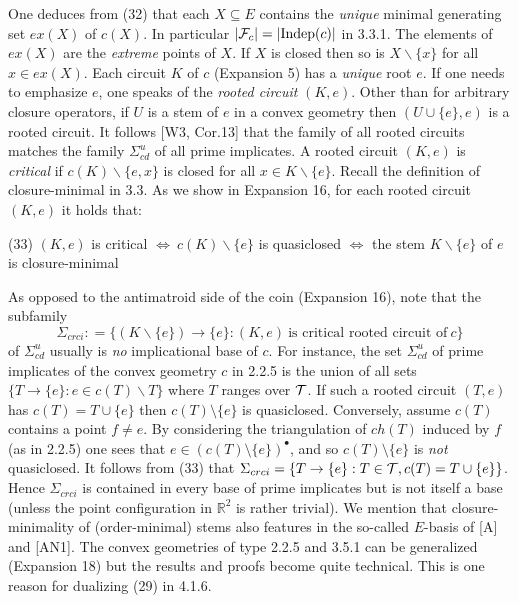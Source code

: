 \documentclass[11pt]{article}
\newcommand{\R}{\mathbb{R}}
\newcommand{\ra}{\rightarrow}
\begin{document}
One deduces from (32) that each $X \subseteq E$ contains the {\it unique} minimal generating set $ex(X)$ of $c(X)$. In particular $|{\cal F}_c| = |\mbox{Indep}(c)|$ in 3.3.1.  The elements of $ex(X)$ are the {\it extreme} points of $X$. If $X$ is closed then so is $X \backslash \{x\}$ for all $x \in ex (X)$.
Each circuit $K$ of $c$ (Expansion 5) has a {\it unique} root $e$. If one needs to emphasize $e$, one speaks of the {\it rooted circuit} $(K, e)$. Other than for arbitrary closure operators, if $U$ is a stem of $e$ in a convex geometry then $(U \cup \{e\}, e)$ is a rooted circuit. It follows [W3, Cor.13] that the family of all rooted circuits matches the family $\Sigma_{cd}^u$ of all prime implicates. A rooted circuit $(K, e)$ is {\it critical} if $c(K) \backslash \{e, x\}$ is closed for all $x \in K \backslash \{e\}$. Recall the definition of closure-minimal in 3.3. As we show in Expansion 16, for each rooted circuit $(K, e)$ it holds that:

(33) \quad $(K, e)$ is critical $\Leftrightarrow \ c(K)\backslash \{e\}$ is quasiclosed $\Leftrightarrow$ the stem $K \backslash \{e\}$ of $e$ is closure-minimal

As opposed to the antimatroid side of the coin (Expansion 16), note that the subfamily
$$\Sigma_{crci} : = \{(K \backslash \{e\}) \ra \{e\} : (K, e) \ \mbox{is critical rooted circuit of} \ c\}$$
of $\Sigma_{cd}^u$ usually is {\it no} implicational base of $c$. For instance, the set $\Sigma_{cd}^u$ of prime implicates of the convex geometry $c$ in 2.2.5 is the union of all sets $\{T \ra \{e\} : e \in c(T) \backslash T\}$ where $T$ ranges over ${\cal T}$. If such a rooted circuit $(T,e)$ has $c(T) = T \cup \{e\}$ then $c(T) \setminus \{e\}$ is quasiclosed. Conversely, assume $c(T)$ contains a point $f \neq e$. By considering the triangulation of $ch(T)$ induced by $f$ (as in 2.2.5) one sees that $e \in (c(T) \setminus \{e\})^\bullet$, and so $c(T) \setminus \{e\}$ is {\it not} quasiclosed. It follows from (33) that $\Sigma_{crci} = \{T\ra \{e\} : T \in {\cal T}, c(T) = T \cup \{e\} \}$. Hence $\Sigma_{crci}$ is contained in every base of prime implicates but is not itself a base (unless the point configuration in $\R^2$ is rather trivial). 
We mention that closure-minimality of (order-minimal) stems also features in the so-called $E$-basis of [A] and [AN1]. The convex geometries of type 2.2.5 and 3.5.1 can be generalized (Expansion 18) but the results and proofs become quite technical. This is one reason for dualizing (29) in 4.1.6. 
\end{document}
